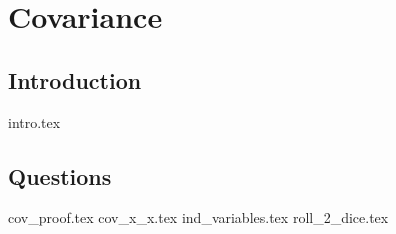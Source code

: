 \documentclass{exam}
\begin{document}
\section{Covariance}
\subsection{Introduction}
{intro.tex}
\subsection{Questions}
\begin{questions}
{cov_proof.tex}
{cov_x_x.tex}
{ind_variables.tex}
{roll_2_dice.tex}
\end{questions}

\begin{comment}
\section{Linear Least Squares Estimator}
{intro.tex}
\subsection{Questions}
\begin{questions}
{find_L.tex}
{find_from_graph.tex}
\end{questions}
\end{comment}
\end{document}
